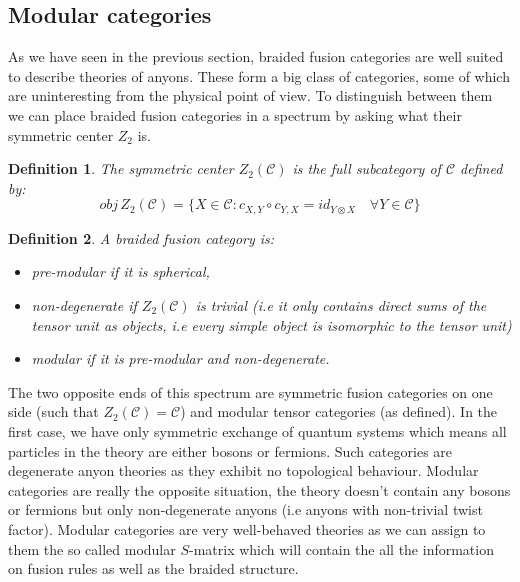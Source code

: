\documentclass{article}
\newtheorem{definition}{Definition}
\begin{document}
\subsection{Modular categories}


As we have seen in the previous section, braided fusion categories are well suited to describe theories of anyons. These form a big class of categories, some of which are uninteresting from the physical point of view. To distinguish between them we can place braided fusion categories in a spectrum by asking what their symmetric center $Z_2$ is. 

\begin{definition}
	The symmetric center $Z_2(\mathcal{C})$ is the full subcategory of $\mathcal{C}$ defined by:
	$$ obj \, Z_2(\mathcal{C}) = \{ X\in \mathcal{C} : c_{X,Y} \circ c_{Y,X} = id_{Y\otimes X} \quad \forall Y \in \mathcal{C} \} $$
\end{definition}

\begin{definition}
	A braided fusion category is:
	\begin{itemize}
		\item pre-modular if it is spherical,
		\item non-degenerate if $Z_2(\mathcal{C})$ is trivial (i.e it only contains direct sums of the tensor unit as objects, i.e every simple object is isomorphic to the tensor unit)
		\item modular if it is pre-modular and non-degenerate.
	\end{itemize}
\end{definition}

The two opposite ends of this spectrum are symmetric fusion categories on one side (such that $Z_2(\mathcal{C})=\mathcal{C}$) and modular tensor categories (as defined). 
In the first case, we have only symmetric exchange of quantum systems which means all particles in the theory are either bosons or fermions. Such categories are degenerate anyon theories as they exhibit no topological behaviour. Modular categories are really the opposite situation, the theory doesn't contain any bosons or fermions but only non-degenerate anyons (i.e anyons with non-trivial twist factor). Modular categories are very well-behaved theories as we can assign to them the so called modular $S$-matrix which will contain the all the information on fusion rules as well as the braided structure.
\end{document}
